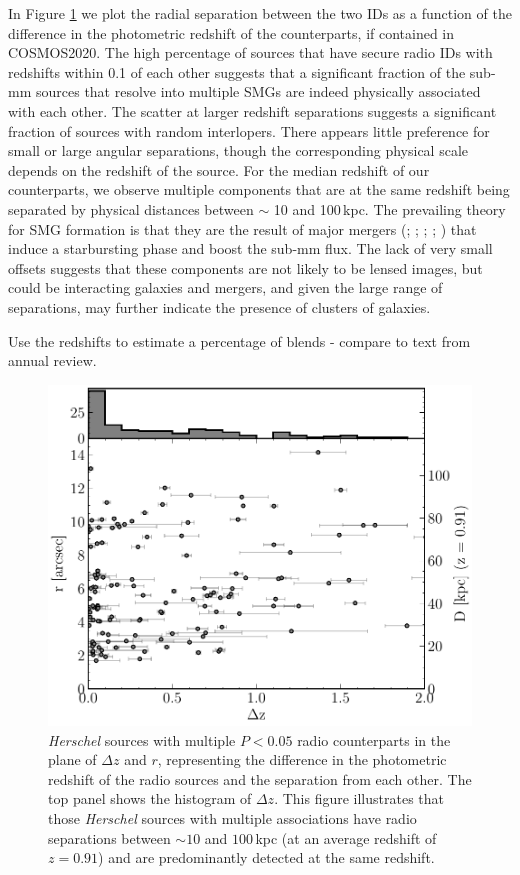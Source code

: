 In Figure \ref{fig:multiples_separation} we plot the radial separation between the two IDs as a function of the difference in the photometric redshift of the counterparts, if contained in COSMOS2020. The high percentage of sources that have secure radio IDs with redshifts within 0.1 of each other suggests that a significant fraction of the sub-mm sources that resolve into multiple SMGs are indeed physically associated with each other. The scatter at larger redshift separations suggests a significant fraction of sources with random interlopers. There appears little preference for small or large angular separations, though the corresponding physical scale depends on the redshift of the source. For the median redshift of our counterparts, we observe multiple components that are at the same redshift being separated by physical distances between $\sim$ 10 and 100\,kpc. The prevailing theory for SMG formation is that they are the result of major mergers (\citealt{Ivison_2002}; \citealt{Smail_2004}; \citealt{Ivison_2007}; \citealt{Engel_2010}; \citealt{Hayward_2011}) that induce a starbursting phase and boost the sub-mm flux. The lack of very small offsets suggests that these components are not likely to be lensed images, but could be interacting galaxies and mergers, and given the large range of separations, may further indicate the presence of clusters of galaxies.

{\color{red}Use the redshifts to estimate a percentage of blends - compare to text from annual review.}

\begin{figure}
	\centering
	\includegraphics[width=0.75\columnwidth]{Figures/multiples_separation.pdf}
	\caption{\textit{Herschel} sources with multiple $P < 0.05$ radio counterparts in the plane of $\Delta z$ and $r$, representing the difference in the photometric redshift of the radio sources and the separation from each other. The top panel shows the histogram of $\Delta z$. This figure illustrates that those \textit{Herschel} sources with multiple associations have radio separations between $\sim 10$ and $100\,$kpc (at an average redshift of $z = 0.91$) and are predominantly detected at the same redshift.}
	\label{fig:multiples_separation}
\end{figure}

